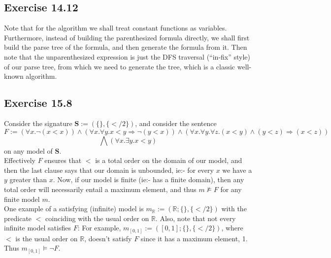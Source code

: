 \documentclass{article}
\begin{document}
\subsection*{Exercise 14.12}
Note that for the algorithm we shall treat constant functions as variables. Furthermore, instead of building the parenthesized formula directly, we shall first build the parse tree of the formula, and then generate the formula from it. Then note that the unparenthesized expression is just the DFS traversal (``in-fix'' style) of our parse tree, from which we need to generate the tree, which is a classic well-known algorithm.
\subsection*{Exercise 15.8}
Consider the signature $\mathbf{S} := (\{\}, \{</2\})$, and consider the sentence 
$$F:= (\forall x.\lnot(x < x))\wedge(\forall x.\forall y. x < y\Rightarrow\lnot(y < x))\wedge(\forall x.\forall y.\forall z.(x < y)\wedge(y < z)\Rightarrow(x < z))$$
$$\bigwedge \left(\forall x.\exists y. x < y\right)$$
on any model of $\mathbf{S}$.\\
Effectively $F$ ensures that $<$ is a total order on the domain of our model, and then the last clause says that our domain is unbounded, ie:- for every $x$ we have a $y$ greater than $x$. Now, if our model is finite (ie:- has a finite domain), then any total order will necessarily entail a maximum element, and thus $m\not\models F$ for any finite model $m$.\\
One example of a satisfying (infinite) model is $m_{\mathbb{R}} := (\mathbb{R}; \{\}, \{</2\})$ with the predicate $<$ coinciding with the usual order on $\mathbb{R}$. Also, note that not every infinite model satisfies $F$: For example, $m_{[0, 1]}:= ([0, 1]; \{\}, \{</2\})$, where $<$ is the usual order on $\mathbb{R}$, doesn't satisfy $F$ since it has a maximum element, 1. Thus $m_{[0, 1]}\models\lnot F$.
\end{document}
